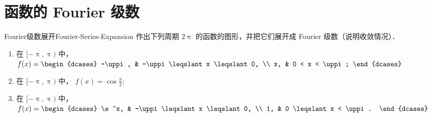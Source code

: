\section{函数的 Fourier 级数}

\begin{problem}{Fourier级数展开}{Fourier-Series-Expansion}
    作出下列周期 $2\uppi$ 的函数的图形，并把它们展开成 Fourier 级数（说明收敛情况）．
    \begin{enumerate}
        \item 在 $[-\uppi, \uppi)$ 中， $f(x) = \begin{dcases} -\uppi, & -\uppi \leqslant x \leqslant 0, \\ x, & 0 < x < \uppi; \end{dcases}$
        \item 在 $[-\uppi, \uppi)$ 中， $f(x) = \cos \frac{x}{2}$;
        \item 在 $[-\uppi, \uppi)$ 中， $f(x) = \begin{dcases} \e^x, & -\uppi \leqslant x \leqslant 0, \\ 1, & 0 \leqslant x < \uppi. \end{dcases}$
    \end{enumerate}
\end{problem}

